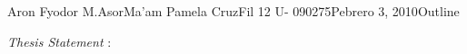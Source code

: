 \documentclass[12pt,letterpaper]{article}
\begin{document}
\begin{mla}{Aron Fyodor M.}{Asor}{Ma'am Pamela Cruz}{Fil 12 U- 090275}{Pebrero 3, 2010}{Outline}

	\noindent \textit{Thesis Statement} : 

\end{mla}
\end{document}
